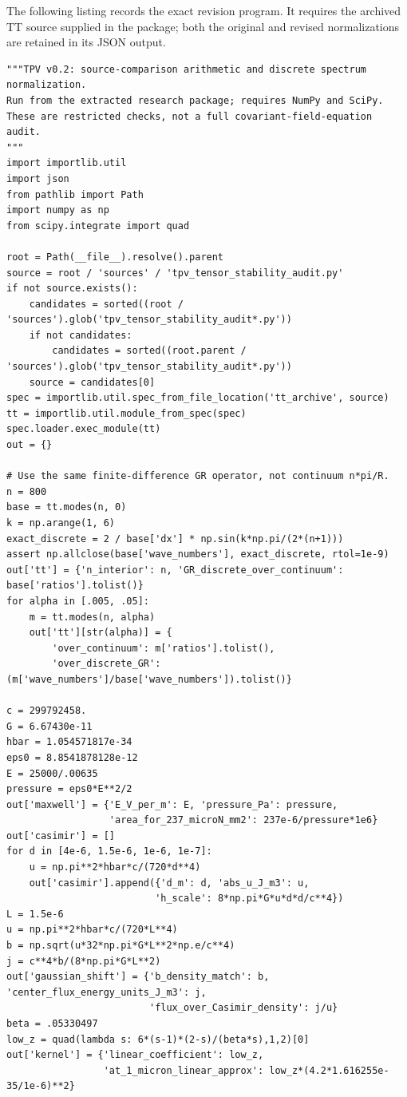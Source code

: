 \documentclass[11pt,oneside]{report}
\begin{document}
The following listing records the exact revision program. It requires the archived TT source supplied in the package; both the original and revised normalizations are retained in its JSON output.
\begin{Verbatim}[breaklines=true,breakanywhere=true,fontsize=\scriptsize]
"""TPV v0.2: source-comparison arithmetic and discrete spectrum normalization.
Run from the extracted research package; requires NumPy and SciPy.
These are restricted checks, not a full covariant-field-equation audit.
"""
import importlib.util
import json
from pathlib import Path
import numpy as np
from scipy.integrate import quad

root = Path(__file__).resolve().parent
source = root / 'sources' / 'tpv_tensor_stability_audit.py'
if not source.exists():
    candidates = sorted((root / 'sources').glob('tpv_tensor_stability_audit*.py'))
    if not candidates:
        candidates = sorted((root.parent / 'sources').glob('tpv_tensor_stability_audit*.py'))
    source = candidates[0]
spec = importlib.util.spec_from_file_location('tt_archive', source)
tt = importlib.util.module_from_spec(spec)
spec.loader.exec_module(tt)
out = {}

# Use the same finite-difference GR operator, not continuum n*pi/R.
n = 800
base = tt.modes(n, 0)
k = np.arange(1, 6)
exact_discrete = 2 / base['dx'] * np.sin(k*np.pi/(2*(n+1)))
assert np.allclose(base['wave_numbers'], exact_discrete, rtol=1e-9)
out['tt'] = {'n_interior': n, 'GR_discrete_over_continuum': base['ratios'].tolist()}
for alpha in [.005, .05]:
    m = tt.modes(n, alpha)
    out['tt'][str(alpha)] = {
        'over_continuum': m['ratios'].tolist(),
        'over_discrete_GR': (m['wave_numbers']/base['wave_numbers']).tolist()}

c = 299792458.
G = 6.67430e-11
hbar = 1.054571817e-34
eps0 = 8.8541878128e-12
E = 25000/.00635
pressure = eps0*E**2/2
out['maxwell'] = {'E_V_per_m': E, 'pressure_Pa': pressure,
                  'area_for_237_microN_mm2': 237e-6/pressure*1e6}
out['casimir'] = []
for d in [4e-6, 1.5e-6, 1e-6, 1e-7]:
    u = np.pi**2*hbar*c/(720*d**4)
    out['casimir'].append({'d_m': d, 'abs_u_J_m3': u,
                          'h_scale': 8*np.pi*G*u*d*d/c**4})
L = 1.5e-6
u = np.pi**2*hbar*c/(720*L**4)
b = np.sqrt(u*32*np.pi*G*L**2*np.e/c**4)
j = c**4*b/(8*np.pi*G*L**2)
out['gaussian_shift'] = {'b_density_match': b, 'center_flux_energy_units_J_m3': j,
                         'flux_over_Casimir_density': j/u}
beta = .05330497
low_z = quad(lambda s: 6*(s-1)*(2-s)/(beta*s),1,2)[0]
out['kernel'] = {'linear_coefficient': low_z,
                 'at_1_micron_linear_approx': low_z*(4.2*1.616255e-35/1e-6)**2}


\end{Verbatim}
\end{document}
